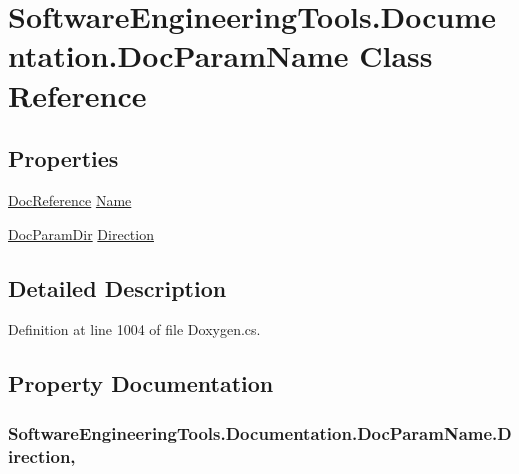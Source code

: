 \hypertarget{class_software_engineering_tools_1_1_documentation_1_1_doc_param_name}{\section{Software\+Engineering\+Tools.\+Documentation.\+Doc\+Param\+Name Class Reference}
\label{class_software_engineering_tools_1_1_documentation_1_1_doc_param_name}
}
\subsection*{Properties}
\begin{DoxyCompactItemize}
\item 
\hyperlink{class_software_engineering_tools_1_1_documentation_1_1_doc_reference}{Doc\+Reference} \hyperlink{class_software_engineering_tools_1_1_documentation_1_1_doc_param_name_ab7dec2f8730fe0d01e3e58ea7005ea2b}{Name}
\item 
\hyperlink{namespace_software_engineering_tools_1_1_documentation_a1884fb8c74d10c2aa19068ac530df736}{Doc\+Param\+Dir} \hyperlink{class_software_engineering_tools_1_1_documentation_1_1_doc_param_name_a84eadb221dca0122ae106517972c7ad4}{Direction}
\end{DoxyCompactItemize}


\subsection{Detailed Description}


Definition at line 1004 of file Doxygen.\+cs.



\subsection{Property Documentation}
\hypertarget{class_software_engineering_tools_1_1_documentation_1_1_doc_param_name_a84eadb221dca0122ae106517972c7ad4}{
\subsubsection[{Direction}]{ Software\+Engineering\+Tools.\+Documentation.\+Doc\+Param\+Name.\+Direction\hspace{0.3cm}{\ttfamily [get]}, {\ttfamily [set]}}}\label{class_software_engineering_tools_1_1_documentation_1_1_doc_param_name_a84eadb221dca0122ae106517972c7ad4}


